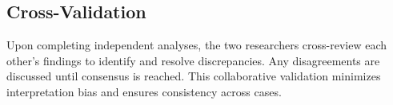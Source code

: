 \subsection{Cross-Validation}
\label{methodology:cross-validation}

Upon completing independent analyses, the two researchers cross-review each other's findings to identify and resolve discrepancies. Any disagreements are discussed until consensus is reached. This collaborative validation minimizes interpretation bias and ensures consistency across cases.
